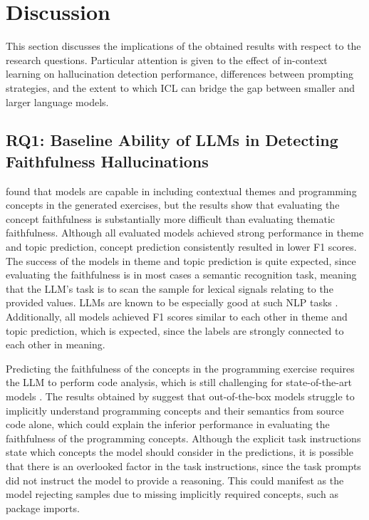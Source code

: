 \documentclass[english, 12pt, a4paper, sci, utf8, a-2b, online]{latex/definitions/aaltothesis}
\begin{document}
\clearpage

\section{Discussion} \label{sec:discussion}

This section discusses the implications of the obtained results with respect to the research questions. Particular attention is given to the effect of in-context learning on hallucination detection performance, differences between prompting strategies, and the extent to which ICL can bridge the gap between smaller and larger language models.

\subsection{RQ1: Baseline Ability of LLMs in Detecting Faithfulness Hallucinations} \label{sec:discussion_rq1}

\textcite{10.1145/3501385.3543957} found that models are capable in including contextual themes and programming concepts in the generated exercises, but the results show that evaluating the concept faithfulness is substantially more difficult than evaluating thematic faithfulness. Although all evaluated models achieved strong performance in theme and topic prediction, concept prediction consistently resulted in lower F1 scores. The success of the models in theme and topic prediction is quite expected, since evaluating the faithfulness is in most cases a semantic recognition task, meaning that the LLM's task is to scan the sample for lexical signals relating to the provided values. LLMs are known to be especially good at such NLP tasks \cite{Minaee2024-fr}. Additionally, all models achieved F1 scores similar to each other in theme and topic prediction, which is expected, since the labels are strongly connected to each other in meaning. 

Predicting the faithfulness of the concepts in the programming exercise requires the LLM to perform code analysis, which is still challenging for state-of-the-art models \cite{rahman2026conceptcoderimprovecodereasoning}. The results obtained by \textcite{rahman2026conceptcoderimprovecodereasoning} suggest that out-of-the-box models struggle to implicitly understand programming concepts and their semantics from source code alone, which could explain the inferior performance in evaluating the faithfulness of the programming concepts. Although the explicit task instructions state which concepts the model should consider in the predictions, it is possible that there is an overlooked factor in the task instructions, since the task prompts did not instruct the model to provide a reasoning. This could manifest as the model rejecting samples due to missing implicitly required concepts, such as package imports.
\end{document}
